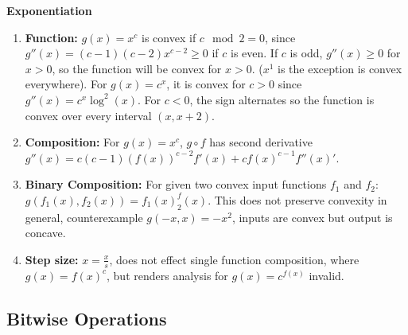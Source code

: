 \documentclass[11pt]{article}
\theoremstyle{definition}
\begin{document}
\textbf{Exponentiation}
\begin{enumerate}
\item \textbf{Function:} $g(x) = x^c$  is convex if $c \mod 2 = 0$, since $g''(x) = (c-1)(c-2)x^{c-2} \geq 0$ if $c$ is even. If $c$ is odd, $g''(x) \geq 0$ for $x > 0$, so the function will be convex for $x>0$. ($x^1$ is the exception is convex everywhere).  For $g(x) = c^x$, it is convex for $c>0$ since $g''(x) = c^x \log^2(x)$. For $c<0$, the sign alternates so the function is convex over every interval $(x, x+2)$.

\item \textbf{Composition:} For $g(x) = x^c$, $g \circ f$ has second derivative $g''(x) = c(c-1) (f(x))^{c-2}f'(x) + cf(x)^{c-1}f''(x)'$. 
\item \textbf{Binary Composition:} For given two convex input functions $f_1$ and $f_2$: $g(f_1(x), f_2(x)) = f_1(x) ^ f_2(x)$. This does not preserve convexity in general, counterexample $g(-x, x) = -x^2$, inputs are convex but output is concave. 
\item \textbf{Step size:}  $x = \frac{x}{s}$, does not effect single function composition, where $g(x) = f(x)^c$, but renders analysis for $g(x) = c^{f(x)}$ invalid.
\end{enumerate}

\subsection{Bitwise Operations}

\end{document}
